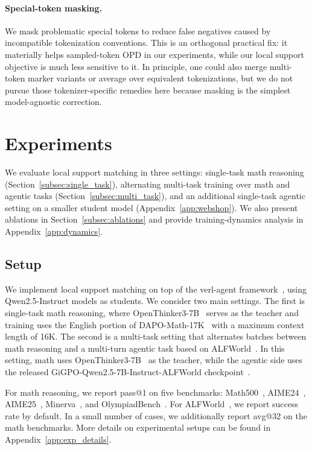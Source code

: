 \documentclass{article}
\begin{document}
\paragraph{Special-token masking.}
We mask problematic special tokens to reduce false negatives caused by incompatible tokenization conventions. This is an orthogonal practical fix: it materially helps sampled-token OPD in our experiments, while our local support objective is much less sensitive to it.
In principle, one could also merge multi-token marker variants or average over equivalent tokenizations, but we do not pursue those tokenizer-specific remedies here because masking is the simplest model-agnostic correction.

\section{Experiments}
\label{sec:experiments}
We evaluate local support matching in three settings: single-task math reasoning (Section~\ref{subsec:single_task}), alternating multi-task training over math and agentic tasks (Section~\ref{subsec:multi_task}), and an additional single-task agentic setting on a smaller student model (Appendix~\ref{app:webshop}). We also present ablations in Section~\ref{subsec:ablations} and provide training-dynamics analysis in Appendix~\ref{app:dynamics}.

\subsection{Setup}
\label{subsec:setup}

We implement local support matching on top of the verl-agent framework~\citep{gigpo2025}, using Qwen2.5-Instruct models as students. We consider two main settings. The first is single-task math reasoning, where OpenThinker3-7B~\citep{openthoughts2025} serves as the teacher and training uses the English portion of DAPO-Math-17K~\citep{yu2025dapo} with a maximum context length of 16K. The second is a multi-task setting that alternates batches between math reasoning and a multi-turn agentic task based on ALFWorld~\citep{alfworld2021}.
In this setting, math uses OpenThinker3-7B~\citep{openthoughts2025} as the teacher, while the agentic side uses the released GiGPO-Qwen2.5-7B-Instruct-ALFWorld checkpoint~\citep{gigpo2025}.

For math reasoning, we report pass@1 on five benchmarks: Math500~\citep{hendrycks2021}, AIME24~\citep{aime24}, AIME25~\citep{aime25}, Minerva~\citep{minerva2022}, and OlympiadBench~\citep{olympiadbench2024}. For ALFWorld~\citep{alfworld2021}, we report success rate by default. In a small number of cases, we additionally report avg@32 on the math benchmarks. More details on experimental setups can be found in Appendix~\ref{app:exp_details}.
\end{document}
